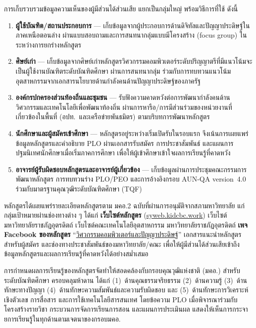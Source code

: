 การเก็บรวบรวมข้อมูลความเห็นของผู้มีส่วนได้ส่วนเสีย แยกเป็นกลุ่มใหญ่ พร้อมวิธีการที่ใช้ ดังนี้
\begin{enumerate}
  \item \textbf{ผู้ใช้บัณฑิต/สถานประกอบการ} — เก็บข้อมูลจากผู้ประกอบการด้านดิจิทัลและปัญญาประดิษฐ์ในภาคเหนือตอนล่าง ผ่านแบบสอบถามและการสนทนากลุ่มแบบมีโครงสร้าง (focus group) ในระหว่างการยกร่างหลักสูตร
  \item \textbf{ศิษย์เก่า} — เก็บข้อมูลจากศิษย์เก่าหลักสูตรวิศวกรรมคอมพิวเตอร์ระดับปริญญาตรีที่มีแนวโน้มจะเป็นผู้ใช้งานบัณฑิตระดับบัณฑิตศึกษา ผ่านการสนทนากลุ่ม ร่วมกับการทบทวนแนวโน้มอุตสาหกรรมจากเอกสารนโยบายด้านกำลังคนด้านปัญญาประดิษฐ์ของภาครัฐ
  \item \textbf{องค์กรปกครองส่วนท้องถิ่นและชุมชน} — รับฟังความคาดหวังต่อการพัฒนากำลังคนด้านวิศวกรรมและเทคโนโลยีเพื่อพัฒนาท้องถิ่น ผ่านการหารือ/การมีส่วนร่วมของหน่วยงานที่เกี่ยวข้องในพื้นที่ (อปท.\ และเครือข่ายพันธมิตร) ตามบริบทการพัฒนาหลักสูตร
  \item \textbf{นักศึกษาและผู้สมัครเข้าศึกษา} — หลักสูตรอยู่ระหว่างเริ่มเปิดรับในรอบแรก จึงเน้นการเผยแพร่ข้อมูลหลักสูตรและคำอธิบาย PLO ผ่านเอกสารรับสมัคร การประชาสัมพันธ์ และแผนการปฐมนิเทศนักศึกษาเมื่อเริ่มภาคการศึกษา เพื่อให้ผู้เข้าศึกษาเข้าใจผลการเรียนรู้ที่คาดหวัง
  \item \textbf{อาจารย์ผู้รับผิดชอบหลักสูตรและอาจารย์ผู้เกี่ยวข้อง} — เก็บข้อมูลผ่านการประชุมคณะกรรมการพัฒนาหลักสูตร การทบทวนร่าง PLO/PEO และการอ้างอิงกรอบ AUN-QA version~4.0 ร่วมกับมาตรฐานคุณวุฒิระดับบัณฑิตศึกษา (TQF)
\end{enumerate}

หลักสูตรได้เผยแพร่รายละเอียดหลักสูตรตาม มคอ.2 ฉบับที่ผ่านการอนุมัติจากสภามหาวิทยาลัย แก่กลุ่มเป้าหมายผ่านช่องทางต่าง ๆ ได้แก่ \textbf{เว็บไซต์หลักสูตร} (\href{https://syweb.kidcbc.work}{syweb.kidcbc.work}) เว็บไซต์มหาวิทยาลัยราชภัฏอุตรดิตถ์ เว็บไซต์คณะเทคโนโลยีอุตสาหกรรม มหาวิทยาลัยราชภัฏอุตรดิตถ์ \textbf{เพจ Facebook ของหลักสูตร} ``\href{https://www.facebook.com/profile.php?id=61577236346855}{วิศวกรรมคอมพิวเตอร์และปัญญาประดิษฐ์}'' เอกสารแนะนำหลักสูตรสำหรับผู้สมัคร และช่องทางประชาสัมพันธ์ของมหาวิทยาลัย/คณะ เพื่อให้ผู้มีส่วนได้ส่วนเสียเข้าถึงข้อมูลหลักสูตรและผลการเรียนรู้ที่คาดหวังได้อย่างสม่ำเสมอ

การกำหนดผลการเรียนรู้ของหลักสูตรจัดทำให้สอดคล้องกับกรอบคุณวุฒิแห่งชาติ (มคอ.) สำหรับระดับบัณฑิตศึกษา ครอบคลุมห้าดาน ได้แก่ (1)~ด้านคุณธรรมจริยธรรม (2)~ด้านความรู้ (3)~ด้านทักษะทางปัญญา (4)~ด้านทักษะความสัมพันธ์และความรับผิดชอบ และ (5)~ด้านทักษะการวิเคราะห์เชิงตัวเลข การสื่อสาร และการใช้เทคโนโลยีสารสนเทศ โดยข้อความ PLO เมื่อพิจารณาร่วมกับโครงสร้างรายวิชา กระบวนการจัดการเรียนการสอน และแผนการประเมินผล แสดงให้เห็นการกระจายการเรียนรู้ในทุกด้านตามเจตนาของกรอบมคอ.

